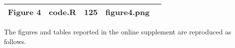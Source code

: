 \documentclass[
]{article}
\begin{document}
\begin{longtable}[]{@{}lllll@{}}
\begin{minipage}[t]{0.13\columnwidth}
Figure 4\strut
\end{minipage} & \begin{minipage}[t]{0.18\columnwidth}\raggedright
code.R\strut
\end{minipage} & \begin{minipage}[t]{0.09\columnwidth}\raggedright
125\strut
\end{minipage} & \begin{minipage}[t]{0.23\columnwidth}\raggedright
figure4.png\strut
\end{minipage} & \begin{minipage}[t]{0.23\columnwidth}\raggedright
\strut
\end{minipage}\tabularnewline
\bottomrule
\end{longtable}


The figures and tables reported in the online supplement are reproduced as follows. 
\end{document}
